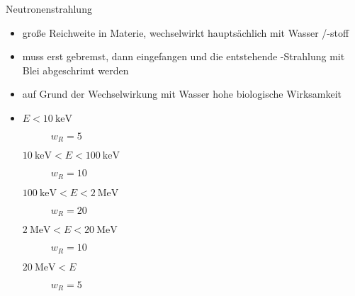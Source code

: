 \begin{frame}{Neutronenstrahlung}
\begin{itemize}
	\item große Reichweite in Materie, wechselwirkt hauptsächlich mit Wasser /-stoff
	\item muss erst gebremst, dann eingefangen und die entstehende \gamma-Strahlung mit Blei abgeschrimt werden
	\item auf Grund der Wechselwirkung mit Wasser hohe biologische Wirksamkeit
	\item \begin{description}
		\item[$E<\SI{10}{\kilo \electronvolt}$] $w_R=5$
		\item[$\SI{10}{\kilo \electronvolt}<E<\SI{100}{\kilo \electronvolt}$] $w_R=10$
		\item[$\SI{100}{\kilo \electronvolt}<E<\SI{2}{\mega \electronvolt}$] $w_R=20$
		\item[$\SI{2}{\mega \electronvolt}<E<\SI{20}{\mega \electronvolt}$] $w_R=10$
		\item[$\SI{20}{\mega \electronvolt}<E$] $w_R=5$
	\end{description}\cite{straschuver}
\end{itemize}
\end{frame}
\nocite{BfS}
